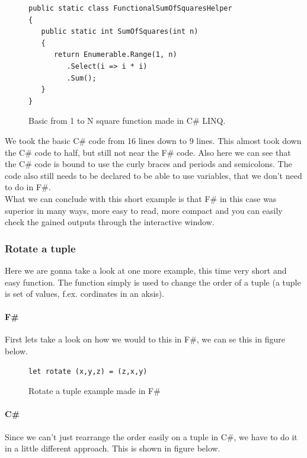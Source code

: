 \documentclass[12pt, a4paper]{article}
\begin{document}
\begin{figure}[!h]
\begin{lstlisting}
public static class FunctionalSumOfSquaresHelper
{
   public static int SumOfSquares(int n)
   {
      return Enumerable.Range(1, n)
         .Select(i => i * i)
         .Sum();
   }
}
\end{lstlisting}
\caption{Basic from 1 to N square function made in C\# LINQ.}
\label{fig:SquareFunctionCSharpLINQ}
\end{figure}

We took the basic C\# code from 16 lines down to 9 lines. This almost took down the C\# code to half, but still not near the F\# code. Also here we can see that the C\# code is bound to use the  curly braces and periods and semicolons. The code also still needs to be declared to be able to use variables, that we don’t need to do in F\#.\\

What we can conclude with this short example is that F\# in this case was superior in many ways, more easy to read, more compact and you can easily check the gained outputs through the interactive window. 

\newpage
\subsubsection{Rotate a tuple}
Here we are gonna take a look at one more example, this time very short and easy function. The function simply is used to change the order of a tuple (a tuple is set of values, f.ex. cordinates in an aksis).\\
   
\paragraph{F\#}
First lets take a look on how we would to this in F\#, we can se this in figure below.

\begin{figure}[!h]
\begin{lstlisting}
let rotate (x,y,z) = (z,x,y)
\end{lstlisting}
\caption{Rotate a tuple example made in F\#}
\label{fig:RotateTupleFSharp}
\end{figure}

\paragraph{C\#}
Since we can’t just rearrange the order easily on a tuple in C\#, we have to do it in a little different approach. This is shown in figure below.\\
\end{document}
